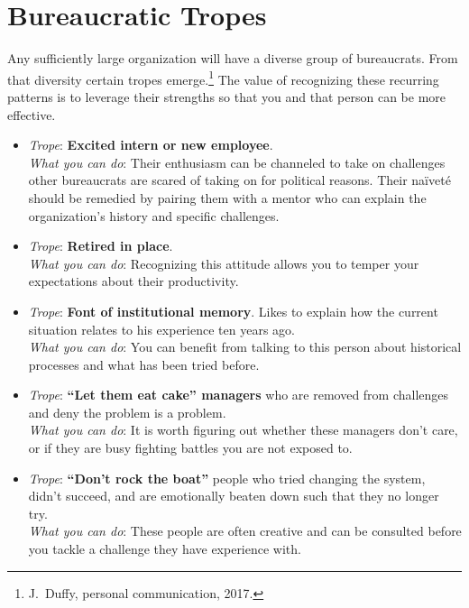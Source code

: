 \section{Bureaucratic Tropes\label{sec:tropes}}

Any sufficiently large organization will have a diverse group of bureaucrats. From that diversity certain tropes emerge.\footnote{J.~Duffy, personal communication, 2017.} The value of recognizing these recurring patterns is to leverage their strengths so that you and that person can be more effective. 


\begin{itemize}
    \item \textit{Trope}: \textbf{Excited intern or new employee}. \\
    \textit{What you can do}: Their enthusiasm can be channeled to take on challenges other bureaucrats are scared of taking on for political reasons. Their na\"ivet\'e 
    should be remedied by pairing them with a mentor who can explain the organization's history and specific challenges.
    
    \item \textit{Trope}: \textbf{Retired in place}. \\
    \textit{What you can do}: Recognizing this attitude allows you to temper your expectations about their productivity. 
    
    \item \textit{Trope}: \textbf{Font of institutional memory}. Likes to explain how the current situation relates to his experience ten years ago. \\
    \textit{What you can do}: You can benefit from talking to this person about historical processes and what has been tried before. 
    
    \item \textit{Trope}: \textbf{``Let them eat cake'' managers} who are removed from challenges and deny the problem is a problem. \\
    \textit{What you can do}: It is worth figuring out whether these managers don't care, or if they are busy fighting battles you are not exposed to.
    
    \item \textit{Trope}: \textbf{``Don't rock the boat''} people who tried changing the system, didn't succeed, and are emotionally beaten down such that they no longer try. \\
    \textit{What you can do}: These people are often creative and can be consulted before you tackle a challenge they have experience with. 
    

\end{itemize}
